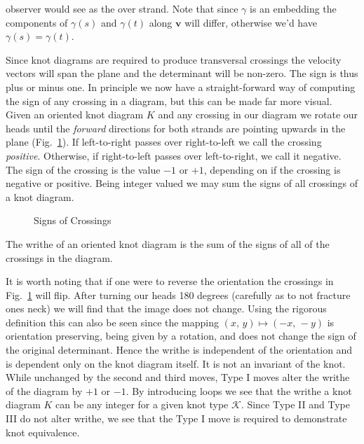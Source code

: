         observer would see as the over strand. Note that since $\gamma$ is
        an embedding the components of $\gamma(s)$ and $\gamma(t)$ along
        $\mathbf{v}$ will differ, otherwise we'd have $\gamma(s)=\gamma(t)$.
        \par\hfill\par
        Since knot diagrams are required to produce transversal crossings the
        velocity vectors will span the plane and the determinant will be
        non-zero. The sign is thus plus or minus one. In principle we now have
        a straight-forward way of computing the sign of any crossing in a
        diagram, but this can be made far more visual.
        Given an oriented knot diagram $K$ and any crossing in our
        diagram we rotate our heads until the \textit{forward} directions for
        both strands are pointing upwards in the plane
        (Fig.~\ref{fig:crossing_signs}). If left-to-right passes over
        right-to-left we call the crossing \textit{positive}. Otherwise,
        if right-to-left passes over left-to-right, we call it negative.
        The sign of the crossing is the value $-1$ or $+1$, depending on if
        the crossing is negative or positive. Being integer valued we may sum
        the signs of all crossings of a knot diagram.
        \begin{figure}
            \centering
            \caption{Signs of Crossings}
            \label{fig:crossing_signs}
        \end{figure}
        \begin{definition}
            The writhe of an oriented knot diagram is the sum of the signs of
            all of the crossings in the diagram.
        \end{definition}
        It is worth noting that if one were to reverse the orientation the
        crossings in Fig.~\ref{fig:crossing_signs} will flip. After turning our
        heads 180 degrees (carefully as to not fracture ones neck) we will
        find that the image does not change. Using the rigorous definition this
        can also be seen since the mapping $(x,\,y)\mapsto(-x,\,-y)$ is
        orientation preserving, being given by a rotation, and does not change
        the sign of the original determinant. Hence the writhe is independent of
        the orientation and is dependent only on the knot diagram itself. It is
        not an invariant of the knot. While unchanged by the second and third
        moves, Type I moves alter the writhe of the diagram by $+1$ or
        $-1$. By introducing loops we see that the writhe a knot diagram $K$
        can be any integer for a given knot type $\mathcal{K}$.
        Since Type II and Type III do not
        alter writhe, we see that the Type I move is required to demonstrate
        knot equivalence.
